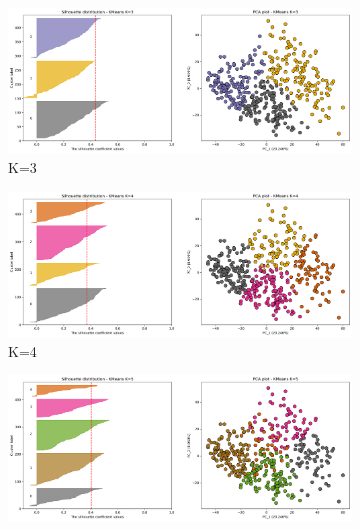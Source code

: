 \begin{figure}[!t]
    \captionsetup[subfigure]{justification=Centering}
    \centering
    \begin{subfigure}[!t]{0.49\textwidth}
        \includegraphics[width=\textwidth]{Sections/ClusteringAnalysis/Resources/cs_top3/sill_distrib/KMeans_3_sill_distrib.png}
        \caption{K=3}
    \end{subfigure}
    \centering
    \begin{subfigure}[!t]{0.49\textwidth}
        \includegraphics[width=\textwidth]{Sections/ClusteringAnalysis/Resources/cs_top3/sill_distrib/KMeans_4_sill_distrib.png}
        \caption{K=4}
    \end{subfigure}
    \centering
    \begin{subfigure}[!t]{0.49\textwidth}
        \includegraphics[width=\textwidth]{Sections/ClusteringAnalysis/Resources/cs_top3/sill_distrib/KMeans_5_sill_distrib.png}

\end{subfigure}
\end{figure}
